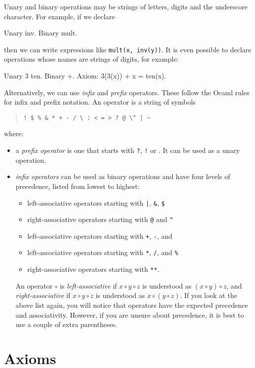 \documentclass{report}
\begin{document}
Unary and binary operations may be strings of letters, digits and the
underscore character. For example, if we declare
%
\begin{alg}
Unary inv.
Binary mult.
\end{alg}
%
then we can write expressions like \texttt{mult(x, inv(y))}. It is
even possible to declare operations whose names are strings of digits,
for example:
%
\begin{alg}
Unary 3 ten.
Binary +.
Axiom: 3(3(x)) + x = ten(x).
\end{alg}
%
Alternatively, we can use \emph{infix} and \emph{prefix} operators.
These follow the Ocaml rules for infix and prefix notation. An
operator is a string of symbols
%
\begin{quote}
  \verb.! $ % & * + - / \ : < = > ? @ \^ | ~.
\end{quote}
where:
%
\begin{itemize}
\item a \emph{prefix operator} is one that starts with \texttt{?},
  \texttt{!} or \texttt{}. It can be used as a unary operation.
\item \emph{infix operators} can be used as binary operations and have
  four levels of precedence, listed from lowest to highest:
  \begin{itemize}
    \item left-associative operators starting with \texttt{|}, \texttt{\&}, \texttt{\$}
    \item right-associative operators starting with \texttt{@} and \texttt{\^}
    \item left-associative operators starting with \texttt{+}, \texttt{-},
      and \texttt{}
    \item left-associative operators starting with \texttt{*}, \texttt{/}, and \texttt{\%} 
    \item right-associative operators starting with \texttt{**}.
  \end{itemize}
  An operator $\circ$ is \emph{left-associative} if $x \circ y \circ
  z$ is understood as $(x \circ y) \circ z$, and
  \emph{right-associative} if $x \circ y \circ z$ is understood as $x
  \circ (y \circ z)$. If you look at the above list again, you will
  notice that operators have the expected precedence and
  associativity. However, if you are unsure about precedence, it is
  best to use a couple of extra parentheses.
\end{itemize}

\section{Axioms}
\end{document}
